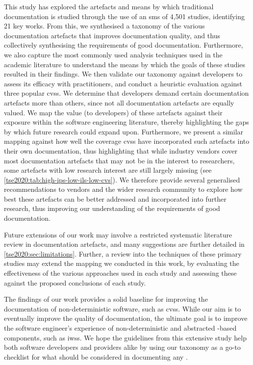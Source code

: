 This study has explored the artefacts and means by which traditional  documentation is studied through the use of an \gls{sms} of 4,501 studies, identifying 21 key works. From this, we synthesised a taxonomy of the various documentation artefacts that improves  documentation quality, and thus collectively synthesising the requirements of good  documentation. Furthermore, we also capture the most commonly used analysis techniques used in the academic literature to understand the means by which the goals of these studies resulted in their findings. We then validate our taxonomy against developers to assess its efficacy with practitioners, and conduct a heuristic evaluation against three popular \glspl{cvs}. We determine that developers demand certain documentation artefacts more than others, since not all documentation artefacts are equally valued. We map the value (to developers) of these artefacts against their exposure within the software engineering literature, thereby highlighting the gaps by which future research could expand upon. Furthermore, we present a similar mapping against how well the coverage \glspl{cvs} have incorporated such artefacts into their own  documentation, thus highlighting that while industry vendors cover most documentation artefacts that may not be in the interest to researchers, some artefacts with low research interest are still largely missing (see \cref{tse2020:tab:high-ips-low-ils-low-cvs}). We therefore provide several generalised recommendations to vendors and the wider research community to explore how best these artefacts can be better addressed and incorporated into further research, thus improving our understanding of the requirements of good  documentation.

Future extensions of our work may involve a restricted systematic literature review in  documentation artefacts, and many suggestions are further detailed in \cref{tse2020:sec:limitations}. Further, a review into the techniques of these primary studies may extend the mapping we conducted in this work, by evaluating the effectiveness of the various approaches used in each study and assessing these against the proposed conclusions of each study.

The findings of our work provides a solid baseline for improving the documentation of non-deterministic software, such as \glspl{cvs}. While our aim is to eventually improve the quality of  documentation, the ultimate goal is to improve the software engineer's experience of non-deterministic and abstracted -based components, such as \glspl{iws}. We hope the guidelines from this extensive study help both software developers and  providers alike by using our taxonomy as a go-to checklist for what should be considered in documenting any .
